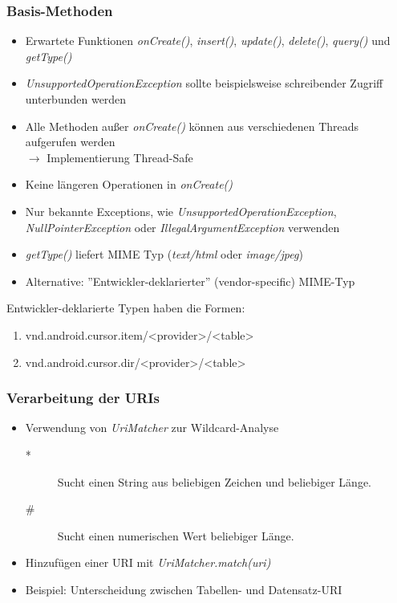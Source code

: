 \begin{frame}
   \frametitle{Basis-Methoden}
   \begin{itemize}
   	\item Erwartete Funktionen \emph{onCreate()}, \emph{insert()}, \emph{update()}, 
   		\emph{delete()}, \emph{query()} und \emph{getType()}
   	\item \emph{UnsupportedOperationException} sollte beispielsweise
   		schreibender Zugriff unterbunden werden
   	\item Alle Methoden außer \emph{onCreate()} können aus verschiedenen Threads 
   		aufgerufen werden\\
   		$\rightarrow$ Implementierung Thread-Safe
   	\item Keine längeren Operationen in \emph{onCreate()}
   	\item Nur bekannte Exceptions, wie \emph{UnsupportedOperationException}, 
   	\emph{NullPointerException} oder \emph{IllegalArgumentException} verwenden
   	\item \emph{getType()} liefert MIME Typ (\emph{text/html} oder \emph{image/jpeg})
   	\item Alternative: ''Entwickler-deklarierter'' (vendor-specific) MIME-Typ
	\end{itemize}
	
	Entwickler-deklarierte Typen haben die Formen:
	
   \begin{enumerate}
   	\item vnd.android.cursor.item/\textless{}provider\textgreater/\textless{}table\textgreater
   	\item vnd.android.cursor.dir/\textless{}provider\textgreater/\textless{}table\textgreater
   \end{enumerate}
\end{frame}

\begin{frame}
   \frametitle{Verarbeitung der URIs}
   \begin{itemize}
   	\item Verwendung von \emph{UriMatcher} zur Wildcard-Analyse
			\begin{description}
				\item[*] Sucht einen String aus beliebigen Zeichen und beliebiger Länge. 
				\item[\#] Sucht einen numerischen Wert beliebiger Länge. 
			\end{description}
   	\item Hinzufügen einer URI mit \emph{UriMatcher.match(uri)}
   	\item Beispiel: Unterscheidung zwischen Tabellen- und Datensatz-URI
   \end{itemize}
\end{frame}

